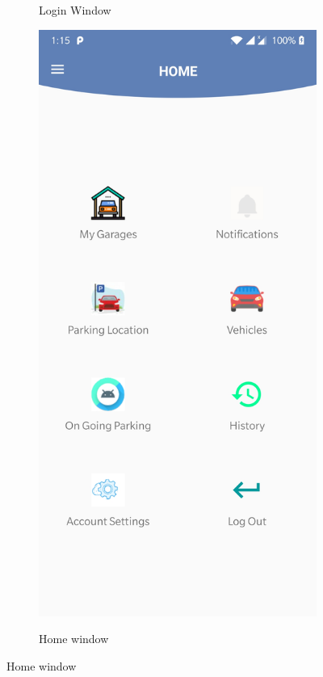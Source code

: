 \documentclass[12pt, english]{article}
\begin{document}
\begin{figure}[h!]
\begin{subfigure}[t]{0.4\textwidth}
        \label{arch5}
        \caption{Login Window}
    \end{subfigure}
    \begin{subfigure}[t]{0.4\textwidth}
    \includegraphics[width=\linewidth]{HomeActivity.jpg}
        \label{arch50}
        \caption{Home window}
    \end{subfigure}
    \label{fig:arp_os}
\end{figure}
\end{document}
